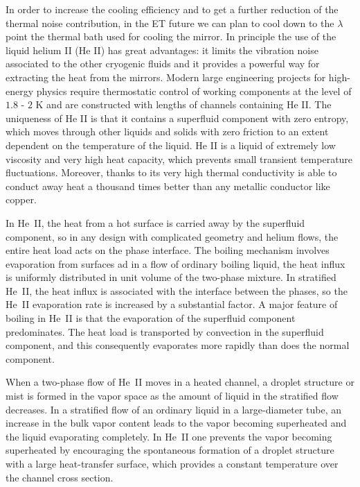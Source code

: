 In order to increase the cooling efficiency and to get a further reduction of the thermal noise contribution, in the ET future we can plan to cool down to the $\lambda$ point  the thermal bath used for cooling the mirror.   In principle the use of the liquid helium II (He II) has great advantages: it limits the vibration noise associated to the other cryogenic fluids \cite{lambda} and it provides a powerful way  for extracting the heat  from the mirrors.
 Modern large engineering projects for high-energy physics require thermostatic control of working components at the level of $1.8$ -  $2$ K and are constructed  with lengths of channels containing He II. The uniqueness of He II is that it contains a superfluid component with zero entropy, which moves through other liquids and solids with zero friction to an extent dependent on the temperature of the liquid.
  He II is a liquid of extremely low viscosity and very high heat capacity, which prevents  small transient temperature fluctuations. Moreover, thanks to its very high thermal conductivity is able to conduct away heat a thousand times better than any metallic conductor like copper.

     In He~II, the heat from a hot surface is carried away by the superfluid component, so in any design with complicated geometry and  helium flows, the entire heat load acts on the phase interface. The boiling mechanism 
involves evaporation from surfaces ad in a flow of ordinary boiling liquid, the heat influx is uniformly distributed in unit volume of the two-phase mixture. In stratified He~II, the heat influx is associated with the interface between the phases, so the He~II evaporation rate is increased by a substantial factor. 
A major feature of boiling in He~II is that the evaporation of the superfluid component predominates. The heat load 
is transported by convection in the superfluid component, and this consequently evaporates more rapidly than does the normal component. 


When a two-phase flow of He~II moves in a heated channel, a droplet structure or mist is formed in the vapor space as the amount of liquid in the stratified flow decreases. In a stratified flow of an ordinary liquid in a large-diameter tube, an increase in the bulk vapor content  leads to the vapor becoming superheated and the liquid evaporating completely. 
In He~II one prevents the vapor becoming superheated  by encouraging the spontaneous formation of a droplet structure with a large heat-transfer surface, which provides a constant temperature over the channel cross section. 


